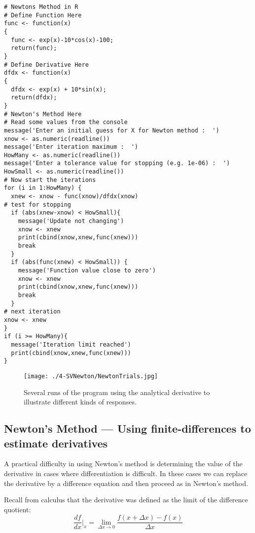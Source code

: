 \newpage
\begin{lstlisting}[caption=R code demonstrating Newton's Method calculations, label=lst:NewtonsMethod]
# Newtons Method in R
# Define Function Here
func <- function(x)
{
  func <- exp(x)-10*cos(x)-100;
  return(func);
}
# Define Derivative Here
dfdx <- function(x)
{
  dfdx <- exp(x) + 10*sin(x); 
  return(dfdx);
}
# Newton's Method Here
# Read some values from the console
message('Enter an initial guess for X for Newton method :  ')
xnow <- as.numeric(readline())
message('Enter iteration maximum :  ')
HowMany <- as.numeric(readline())
message('Enter a tolerance value for stopping (e.g. 1e-06) :  ')
HowSmall <- as.numeric(readline())
# Now start the iterations
for (i in 1:HowMany) {
  xnew <- xnow - func(xnow)/dfdx(xnow)
# test for stopping
  if (abs(xnew-xnow) < HowSmall){
    message('Update not changing')
    xnow <- xnew
    print(cbind(xnow,xnew,func(xnew)))
    break
  }
  if (abs(func(xnew) < HowSmall)) {
    message('Function value close to zero')
    xnow <- xnew
    print(cbind(xnow,xnew,func(xnew)))
    break    
  }
# next iteration
xnow <- xnew
}
if (i >= HowMany){
  message('Iteration limit reached')
  print(cbind(xnow,xnew,func(xnew)))
}
\end{lstlisting}

\begin{figure}[h!] %
   \centering
   \texttt{[image: ./4-SVNewton/NewtonTrials.jpg]} 
   \caption{Several runs of the program using the analytical derivative to illustrate different kinds of responses.}
   \label{fig:NewtonTrials}
\end{figure}

\subsection{Newton's Method --- Using finite-differences to estimate derivatives}
A practical difficulty in using Newton's method is determining the value of the derivative in cases where differentiation is difficult.  
In these cases we can replace the derivative by a difference equation and then proceed as in Newton's method. 

Recall from calculus that the derivative was defined as the limit of the difference quotient:
\begin{equation}
\frac{df}{dx}\vert_{x} = \lim_{\Delta x \rightarrow 0}\frac{f(x + \Delta x) - f(x) }{\Delta x}
\end{equation}

